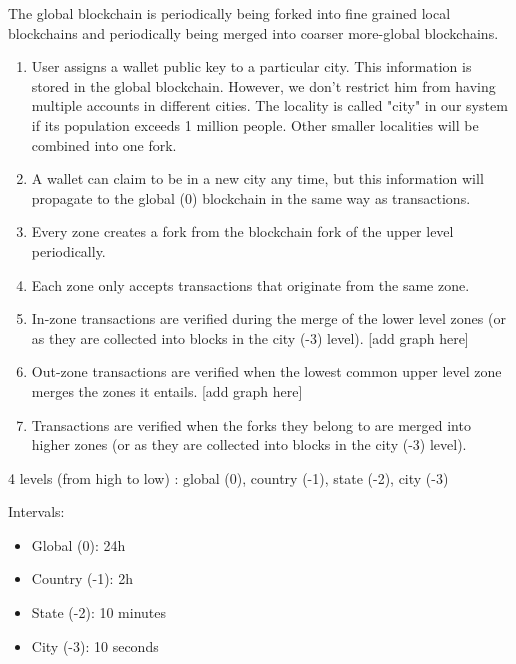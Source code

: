 \documentclass[portrait,a0paper,fontscale=0.285]{baposter} %
\begin{document}
\begin{poster}
{\begin{multicols}{2}
The global blockchain is periodically being forked into fine grained local blockchains and periodically being merged into coarser more-global blockchains.

\begin{enumerate}

    \item User assigns a wallet public key to a particular city. This information is stored in the global blockchain. However, we don't restrict him from having multiple accounts in different cities. The locality is called "city" in our system if its population exceeds 1 million people. Other smaller localities will be combined into one fork.

    \item A wallet can claim to be in a new city any time, but this information will propagate to the global (0) blockchain in the same way as transactions.

    \item Every zone creates a fork from the blockchain fork of the upper level periodically.

    \item Each zone only accepts transactions that originate from the same zone.

    \item In-zone transactions are verified during the merge of the lower level zones (or as they are collected into blocks in the city (-3) level). [add graph here]

    \item Out-zone transactions are verified when the lowest common upper level zone merges the zones it entails. [add graph here]

    \item Transactions are verified when the forks they belong to are merged into higher zones (or as they are collected into blocks in the city (-3) level).

\end{enumerate}

4 levels (from high to low) : global (0), country (-1), state (-2), city (-3)

Intervals:
\begin{itemize}
    \item Global (0): 24h
    \item Country (-1): 2h
    \item State (-2): 10 minutes
    \item City (-3): 10 seconds
\end{itemize}


\end{multicols}}
\end{poster}
\end{document}
